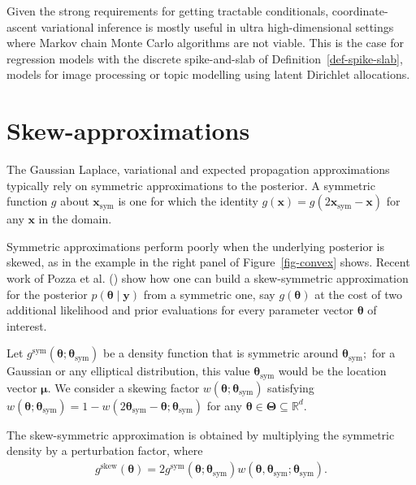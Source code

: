 \documentclass[
  11pt,
  letterpaper,
]{scrbook}
\theoremstyle{definition}
\theoremstyle{plain}
\theoremstyle{plain}
\theoremstyle{plain}
\theoremstyle{definition}
\theoremstyle{definition}
\theoremstyle{plain}
\theoremstyle{plain}
\theoremstyle{remark}
\begin{document}
Given the strong requirements for getting tractable conditionals,
coordinate-ascent variational inference is mostly useful in ultra
high-dimensional settings where Markov chain Monte Carlo algorithms are
not viable. This is the case for regression models with the discrete
spike-and-slab of Definition~\ref{def-spike-slab}, models for image
processing or topic modelling using latent Dirichlet allocations.

\section{Skew-approximations}\label{skew-approximations}

The Gaussian Laplace, variational and expected propagation
approximations typically rely on symmetric approximations to the
posterior. A symmetric function \(g\) about
\(\boldsymbol{x}_{\text{sym}}\) is one for which the identity
\(g(\boldsymbol{x}) = g(2\boldsymbol{x}_{\text{sym}}-\boldsymbol{x})\)
for any \(\boldsymbol{x}\) in the domain.

Symmetric approximations perform poorly when the underlying posterior is
skewed, as in the example in the right panel of Figure~\ref{fig-convex}
shows. Recent work of Pozza et al.
() show how one can build a
skew-symmetric approximation for the posterior
\(p(\boldsymbol{\theta} \mid \boldsymbol{y})\) from a symmetric one, say
\(g(\boldsymbol{\theta})\) at the cost of two additional likelihood and
prior evaluations for every parameter vector \(\boldsymbol{\theta}\) of
interest.

Let
\(g^{\text{sym}}(\boldsymbol{\theta}; \boldsymbol{\theta}_{\text{sym}})\)
be a density function that is symmetric around
\(\boldsymbol{\theta}_{\text{sym}};\) for a Gaussian or any elliptical
distribution, this value \(\boldsymbol{\theta}_{\text{sym}}\) would be
the location vector \(\boldsymbol{\mu}.\) We consider a skewing factor
\(w(\boldsymbol{\theta};  \boldsymbol{\theta}_{\text{sym}})\) satisfying
\(w(\boldsymbol{\theta}; \boldsymbol{\theta}_{\text{sym}}) = 1-w(2\boldsymbol{\theta}_{\text{sym}}-\boldsymbol{\theta}; \boldsymbol{\theta}_{\text{sym}})\)
for any
\(\boldsymbol{\theta} \in \boldsymbol{\Theta} \subseteq \mathbb{R}^d.\)

The skew-symmetric approximation is obtained by multiplying the
symmetric density by a perturbation factor, where \begin{align*}
g^{\text{skew}}(\boldsymbol{\theta}) = 2 g^{\text{sym}}(\boldsymbol{\theta}; \boldsymbol{\theta}_{\text{sym}})w(\boldsymbol{\theta}, \boldsymbol{\theta}_{\text{sym}}; \boldsymbol{\theta}_{\text{sym}}).
\end{align*}
\end{document}
